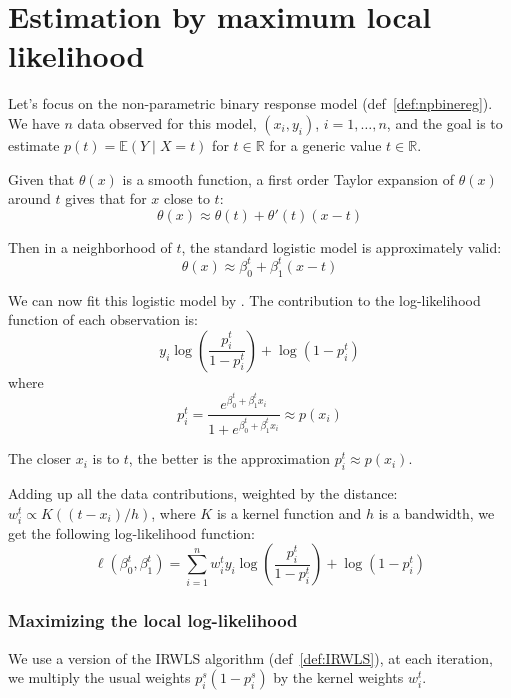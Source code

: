 \pagebreak
\section{Estimation by maximum local likelihood}

Let's focus on the non-parametric binary response model (def~\ref{def:npbinereg}).
We have $n$ data observed for this model, $(x_i, y_i)$, $i = 1, \ldots, n$,
and the goal is to estimate $p(t) = \mathds{E}(Y \mid X = t)$ for $t \in \mathbb{R}$
for a generic value $t \in \mathds{R}$.

Given that $\theta(x)$ is a smooth function, a first order
Taylor expansion of $\theta(x)$ around $t$ gives that for $x$ close to $t$:
\begin{equation*}
    \theta(x) \approx \theta(t) + \theta'(t) (x - t)
\end{equation*}

Then in a neighborhood of $t$, the standard logistic model is approximately
valid:
\begin{equation*}
    \theta(x) \approx \beta_0^t + \beta_1^t (x - t)
\end{equation*}

We can now fit this logistic model by .
The contribution to the log-likelihood function of each observation is:
\begin{equation*}
    y_i\log\left(
        \frac{p_i^t}{1 - p_i^t}
    \right) + \log\left(1 - p_i^t\right)
\end{equation*}
where
\begin{equation*}
    p_i^t = \frac{e^{\beta_0^t + \beta_1^t x_i }}{1 + e^{\beta_0^t + \beta_1^t x_i }}
    \approx p(x_i)
\end{equation*}

The closer $x_i$ is to $t$, the better is the approximation $p_i^t \approx p(x_i)$.

Adding up all the data contributions, weighted by the distance:
$w_i^t \propto K((t - x_i)/h)$, where $K$ is a kernel function and $h$ is a bandwidth,
we get the following log-likelihood function:
\begin{equation*}
    \ell(\beta_0^t, \beta_1^t) = \sum_{i = 1}^n w_i^t y_i\log\left(
        \frac{p_i^t}{1 - p_i^t}
    \right) + \log\left(1 - p_i^t\right)
\end{equation*}

\subsubsection{Maximizing the local log-likelihood}
We use a  version of the IRWLS algorithm (def~\ref{def:IRWLS}),
at each iteration, we multiply the usual weights $p_i^s(1 - p_i^s)$ by the
kernel weights $w_i^t$.


